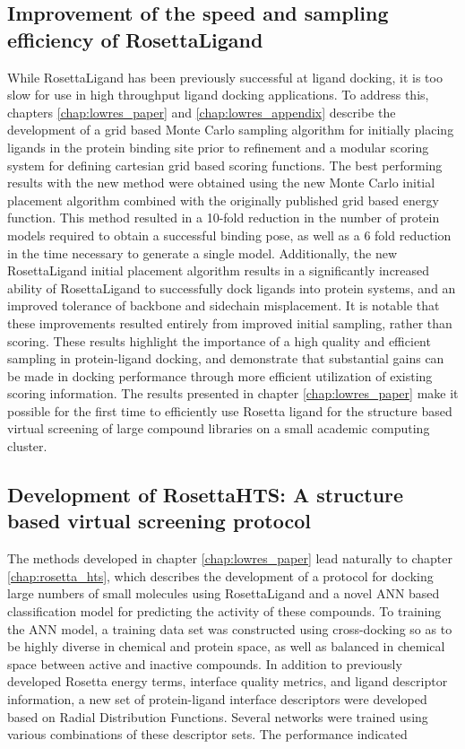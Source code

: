 \subsection{Improvement of the speed and sampling efficiency of RosettaLigand}
While RosettaLigand has been previously successful at ligand docking\citep{Lemmon:2012ku,Combs:2011db,Allison:2013ir}, it is too slow for use in high throughput ligand docking applications.
To address this, chapters \ref{chap:lowres_paper} and \ref{chap:lowres_appendix} describe the development of a grid based Monte Carlo sampling algorithm for initially placing ligands in the protein binding site prior to refinement and a modular scoring system for defining cartesian grid based scoring functions.
The best performing results with the new method were obtained using the new Monte Carlo initial placement algorithm combined with the originally published grid based energy function.
This method resulted in a 10-fold reduction in the number of protein models required to obtain a successful binding pose, as well as a 6 fold reduction in the time necessary to generate a single model.
Additionally, the new RosettaLigand initial placement algorithm results in a significantly increased ability of RosettaLigand to successfully dock ligands into protein systems, and an improved tolerance of backbone and sidechain misplacement.
It is notable that these improvements resulted entirely from improved initial sampling, rather than scoring.
These results highlight the importance of a high quality and efficient sampling in protein-ligand docking, and demonstrate that substantial gains can be made in docking performance through more efficient utilization of existing scoring information.
The results presented in chapter \ref{chap:lowres_paper} make it possible for the first time to efficiently use Rosetta ligand for the structure based virtual screening of large compound libraries on a small academic computing cluster.

\subsection{Development of RosettaHTS: A structure based virtual screening protocol}
The methods developed in chapter \ref{chap:lowres_paper} lead naturally to chapter \ref{chap:rosetta_hts}, which describes the development of a protocol for docking large numbers of small molecules using RosettaLigand and a novel ANN based classification model for predicting the activity of these compounds.
To training the ANN model, a training data set was constructed using cross-docking so as to be highly diverse in chemical and protein space, as well as balanced in chemical space between active and inactive compounds.
In addition to previously developed Rosetta energy terms, interface quality metrics, and ligand descriptor information, a new set of protein-ligand interface descriptors were developed based on Radial Distribution Functions.
Several networks were trained using various combinations of these descriptor sets.
The performance indicated %


